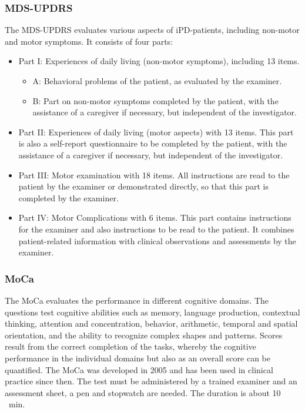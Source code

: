 \subsubsection{\acf{MDS-UPDRS}}
\label{questionnaires:updrs}
The \ac{MDS-UPDRS} \cite{goetz2007updrs} evaluates various aspects of \ac{iPD}-patients, including non-motor and motor symptoms. It consists of four parts:
\begin{itemize}
\item Part I: Experiences of daily living (non-motor symptoms), including 13 items.
\begin{itemize}
\item A: Behavioral problems of the patient, as evaluated by the examiner.
\item B: Part on non-motor symptoms completed by the patient, with the assistance of a caregiver if necessary, but independent of the investigator.
\end{itemize}
\item Part II: Experiences of daily living (motor aspects) with 13 items. This part is also a self-report questionnaire to be completed by the patient, with the assistance of a caregiver if necessary, but independent of the investigator.
\item Part III: Motor examination with 18 items. All instructions are read to the patient by the examiner or demonstrated directly, so that this part is completed by the examiner.
\item Part IV: Motor Complications with 6 items. This part contains instructions for the examiner and also instructions to be read to the patient. It combines patient-related information with clinical observations and assessments by the examiner.
\end{itemize}

\subsubsection{\acf{MoCa}}
\label{questionnaires:MoCa}
The \acl{MoCa} evaluates the performance in different cognitive domains. The questions test cognitive abilities such as memory, language production, contextual thinking, attention and concentration, behavior, arithmetic, temporal and spatial orientation, and the ability to recognize complex shapes and patterns. Scores result from the correct completion of the tasks, whereby the cognitive performance in the individual domains but also as an overall score can be quantified. The \ac{MoCa} was developed in 2005 \cite{nasreddine2005moca} and has been used in clinical practice since then. The test must be administered by a trained examiner and an assessment sheet, a pen and stopwatch are needed. The duration is about \num[round-precision = 0, round-mode=places]{10} \SI{}{\minute}.


